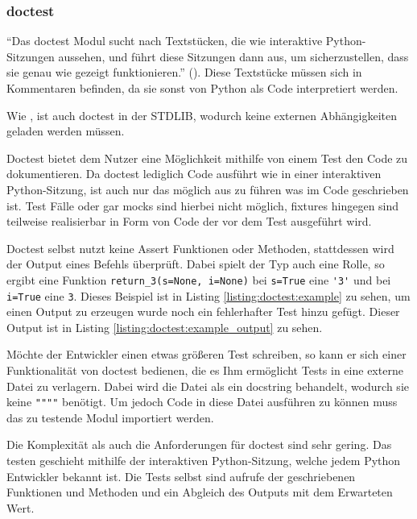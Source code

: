\subsubsection{doctest}\label{python-tools:doctest}

"`Das doctest Modul sucht nach Textstücken, die wie interaktive Python-Sitzungen aussehen, und führt diese Sitzungen dann aus, um sicherzustellen, dass sie genau wie gezeigt funktionieren."' (\cite{docs.python:doctest}). Diese Textstücke müssen sich in Kommentaren befinden, da sie
sonst von Python als Code interpretiert werden.

Wie , ist auch doctest in der STDLIB, wodurch keine externen
Abhängigkeiten geladen werden müssen.

Doctest bietet dem Nutzer eine Möglichkeit mithilfe von einem Test den Code zu dokumentieren.
Da doctest lediglich Code ausführt wie in einer interaktiven Python-Sitzung, ist auch nur
das möglich aus zu führen was im Code geschrieben ist. Test Fälle oder gar \Glspl{mock} sind 
hierbei nicht möglich, \Glspl{fixture} hingegen sind teilweise realisierbar in Form von Code der
vor dem Test ausgeführt wird.

Doctest selbst nutzt keine Assert Funktionen oder Methoden, stattdessen wird der Output eines
Befehls überprüft. Dabei spielt der Typ auch eine Rolle, so ergibt eine Funktion
\lstinline{return_3(s=None, i=None)} bei \lstinline{s=True} eine \lstinline{'3'} und bei
\lstinline{i=True} eine \lstinline{3}. Dieses Beispiel ist in Listing \ref{listing:doctest:example}
zu sehen, um einen Output zu erzeugen wurde noch ein fehlerhafter Test hinzu gefügt. Dieser Output
ist in Listing \ref{listing:doctest:example_output} zu sehen.

Möchte der Entwickler einen etwas größeren Test schreiben, so kann er sich einer Funktionalität
von doctest bedienen, die es Ihm ermöglicht Tests in eine externe Datei zu verlagern. Dabei
wird die Datei als ein \Gls{docstring} behandelt, wodurch sie keine \lstinline{""""} benötigt.
Um jedoch Code in diese Datei ausführen zu können muss das zu testende Modul importiert werden.

Die Komplexität als auch die Anforderungen für doctest sind sehr gering. Das testen geschieht
mithilfe der interaktiven Python-Sitzung, welche jedem Python Entwickler bekannt ist. Die
Tests selbst sind aufrufe der geschriebenen Funktionen und Methoden und ein Abgleich des
Outputs mit dem Erwarteten Wert.

